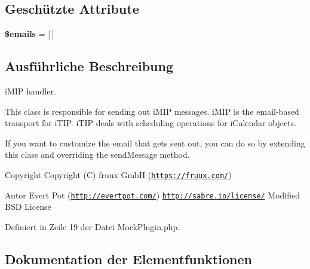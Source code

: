 \subsection*{Geschützte Attribute}
\begin{DoxyCompactItemize}
\item 
\mbox{\label{class_sabre_1_1_cal_d_a_v_1_1_schedule_1_1_i_mip_1_1_mock_plugin_af5af409b38469c178470029482fbb996}} 
{\bfseries \$emails} = \mbox{[}$\,$\mbox{]}
\end{DoxyCompactItemize}


\subsection{Ausführliche Beschreibung}
i\+M\+IP handler.

This class is responsible for sending out i\+M\+IP messages. i\+M\+IP is the email-\/based transport for i\+T\+IP. i\+T\+IP deals with scheduling operations for i\+Calendar objects.

If you want to customize the email that gets sent out, you can do so by extending this class and overriding the send\+Message method.

\begin{DoxyCopyright}{Copyright}
Copyright (C) fruux GmbH (\href{https://fruux.com/}{\tt https\+://fruux.\+com/}) 
\end{DoxyCopyright}
\begin{DoxyAuthor}{Autor}
Evert Pot (\href{http://evertpot.com/}{\tt http\+://evertpot.\+com/})  \href{http://sabre.io/license/}{\tt http\+://sabre.\+io/license/} Modified B\+SD License 
\end{DoxyAuthor}


Definiert in Zeile 19 der Datei Mock\+Plugin.\+php.



\subsection{Dokumentation der Elementfunktionen}
\mbox{\label{class_sabre_1_1_cal_d_a_v_1_1_schedule_1_1_i_mip_1_1_mock_plugin_a6b93fc1f0d5ac4face750441e6a9465b}} 
